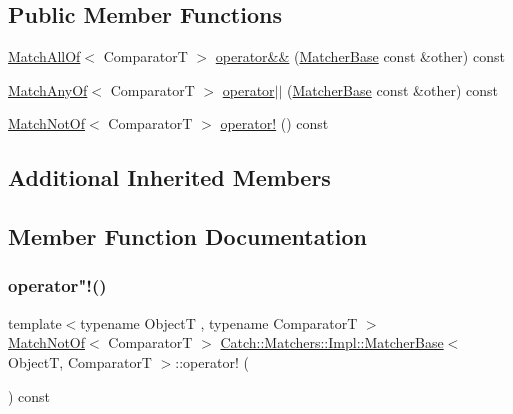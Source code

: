 \subsection*{Public Member Functions}
\begin{DoxyCompactItemize}
\item 
\hyperlink{struct_catch_1_1_matchers_1_1_impl_1_1_match_all_of}{Match\+All\+Of}$<$ ComparatorT $>$ \hyperlink{struct_catch_1_1_matchers_1_1_impl_1_1_matcher_base_a3deede6b29d20c15cb5efc79df40a520}{operator\&\&} (\hyperlink{struct_catch_1_1_matchers_1_1_impl_1_1_matcher_base}{Matcher\+Base} const \&other) const
\item 
\hyperlink{struct_catch_1_1_matchers_1_1_impl_1_1_match_any_of}{Match\+Any\+Of}$<$ ComparatorT $>$ \hyperlink{struct_catch_1_1_matchers_1_1_impl_1_1_matcher_base_ae0345ee76d109ac6d0241be261450ebc}{operator$\vert$$\vert$} (\hyperlink{struct_catch_1_1_matchers_1_1_impl_1_1_matcher_base}{Matcher\+Base} const \&other) const
\item 
\hyperlink{struct_catch_1_1_matchers_1_1_impl_1_1_match_not_of}{Match\+Not\+Of}$<$ ComparatorT $>$ \hyperlink{struct_catch_1_1_matchers_1_1_impl_1_1_matcher_base_a85174b5b27113f7bdc47c140c1c72602}{operator!} () const
\end{DoxyCompactItemize}
\subsection*{Additional Inherited Members}


\subsection{Member Function Documentation}
\mbox{\label{struct_catch_1_1_matchers_1_1_impl_1_1_matcher_base_a85174b5b27113f7bdc47c140c1c72602}} 
\subsubsection{\texorpdfstring{operator"!()}{operator!()}}
{\footnotesize\ttfamily template$<$typename ObjectT , typename ComparatorT $>$ \\
\hyperlink{struct_catch_1_1_matchers_1_1_impl_1_1_match_not_of}{Match\+Not\+Of}$<$ ComparatorT $>$ \hyperlink{struct_catch_1_1_matchers_1_1_impl_1_1_matcher_base}{Catch\+::\+Matchers\+::\+Impl\+::\+Matcher\+Base}$<$ ObjectT, ComparatorT $>$\+::operator! (\begin{DoxyParamCaption}{ }\end{DoxyParamCaption}) const}

